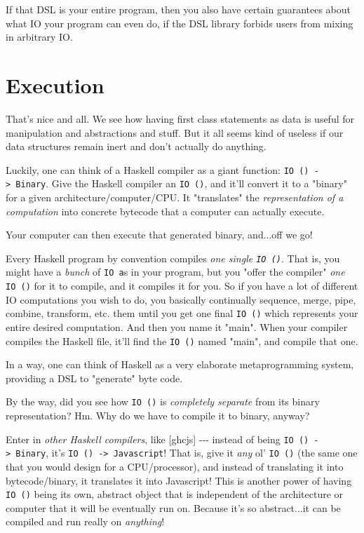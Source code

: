\documentclass[]{article}
\begin{document}
If that DSL is your entire program, then you also have certain guarantees about
what IO your program can even do, if the DSL library forbids users from mixing
in arbitrary IO.

\section{Execution}

That's nice and all. We see how having first class statements as data is useful
for manipulation and abstractions and stuff. But it all seems kind of useless if
our data structures remain inert and don't actually do anything.

Luckily, one can think of a Haskell compiler as a giant function:
\texttt{IO\ ()\ -\textgreater{}\ Binary}. Give the Haskell compiler an
\texttt{IO\ ()}, and it'll convert it to a "binary" for a given
architecture/computer/CPU. It "translates" the \emph{representation of a
computation} into concrete bytecode that a computer can actually execute.

Your computer can then execute that generated binary, and...off we go!

Every Haskell program by convention compiles \emph{one single \texttt{IO\ ()}}.
That is, you might have a \emph{bunch} of \texttt{IO\ a}s in your program, but
you "offer the compiler" \emph{one} \texttt{IO\ ()} for it to compile, and it
compiles it for you. So if you have a lot of different IO computations you wish
to do, you basically continually sequence, merge, pipe, combine, transform, etc.
them until you get one final \texttt{IO\ ()} which represents your entire
desired computation. And then you name it "main". When your compiler compiles
the Haskell file, it'll find the \texttt{IO\ ()} named "main", and compile that
one.

In a way, one can think of Haskell as a very elaborate metaprogramming system,
providing a DSL to "generate" byte code.

By the way, did you see how \texttt{IO\ ()} is \emph{completely separate} from
its binary representation? Hm. Why do we have to compile it to binary, anyway?

Enter in \emph{other Haskell compilers}, like {[}ghcjs{]} -\/-\/- instead of
being \texttt{IO\ ()\ -\textgreater{}\ Binary}, it's
\texttt{IO\ ()\ -\textgreater{}\ Javascript}! That is, give it \emph{any} ol'
\texttt{IO\ ()} (the same one that you would design for a CPU/processor), and
instead of translating it into bytecode/binary, it translates it into
Javascript! This is another power of having \texttt{IO\ ()} being its own,
abstract object that is independent of the architecture or computer that it will
be eventually run on. Because it's so abstract...it can be compiled and run
really on \emph{anything}!
\end{document}

